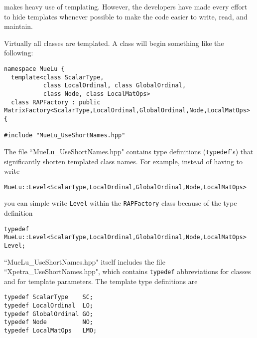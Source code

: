 \muelu makes heavy use of templating.  However, the developers have made every effort to hide templates
whenever possible to make the code easier to write, read, and maintain.

Virtually all \muelu classes are templated.  A class will begin something like the following:

\begin{verbatim}
namespace MueLu {
  template<class ScalarType,
           class LocalOrdinal, class GlobalOrdinal,
           class Node, class LocalMatOps>
  class RAPFactory : public MatrixFactory<ScalarType,LocalOrdinal,GlobalOrdinal,Node,LocalMatOps> {

#include "MueLu_UseShortNames.hpp"
\end{verbatim}
%
The file ``MueLu\_UseShortNames.hpp" contains type definitions (\verb!typedef!'s) that significantly shorten
templated class names.  For example, instead of having to write
\begin{verbatim}
MueLu::Level<ScalarType,LocalOrdinal,GlobalOrdinal,Node,LocalMatOps>
\end{verbatim}
you can simple write \verb!Level!  within the \verb!RAPFactory! class because of the type definition
\begin{verbatim}
typedef MueLu::Level<ScalarType,LocalOrdinal,GlobalOrdinal,Node,LocalMatOps> Level;
\end{verbatim}
``MueLu\_UseShortNames.hpp" itself includes the file ``Xpetra\_UseShortNames.hpp", which contains
\verb!typedef! abbreviations for \xpetra classes and for template parameters.  The template
type definitions are
%
\begin{verbatim}
typedef ScalarType    SC;
typedef LocalOrdinal  LO;
typedef GlobalOrdinal GO;
typedef Node          NO;
typedef LocalMatOps   LMO;
\end{verbatim}
